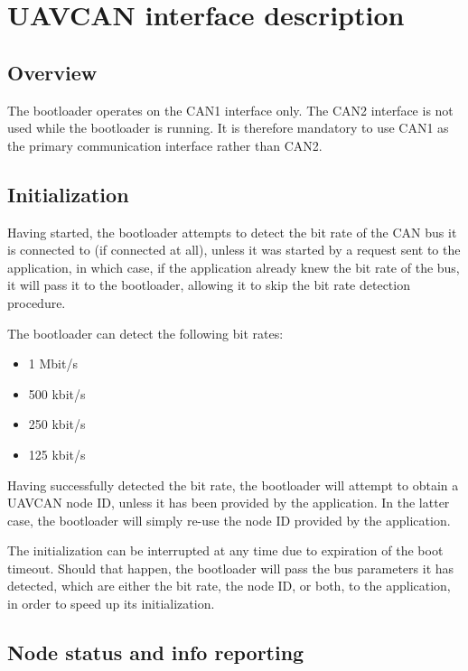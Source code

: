 \documentclass{zubaxdoc}
\begin{document}
\section{UAVCAN interface description}

\subsection{Overview}

The bootloader operates on the CAN1 interface only.
The CAN2 interface is not used while the bootloader is running.
It is therefore mandatory to use CAN1 as the primary communication interface
rather than CAN2.

\subsection{Initialization}

Having started, the bootloader attempts to detect the bit rate of the CAN bus it is connected to
(if connected at all), unless it was started by a request sent to the application, in which case,
if the application already knew the bit rate of the bus, it will pass it to the bootloader,
allowing it to skip the bit rate detection procedure.

The bootloader can detect the following bit rates:
\begin{itemize}
\item 1 Mbit/s
\item 500 kbit/s
\item 250 kbit/s
\item 125 kbit/s
\end{itemize}

Having successfully detected the bit rate, the bootloader will attempt to obtain a UAVCAN node ID,
unless it has been provided by the application.
In the latter case, the bootloader will simply re-use the node ID provided by the application.

The initialization can be interrupted at any time due to expiration of the boot timeout.
Should that happen, the bootloader will pass the bus parameters it has detected,
which are either the bit rate, the node ID, or both, to the application,
in order to speed up its initialization.

\subsection{Node status and info reporting}
\end{document}
